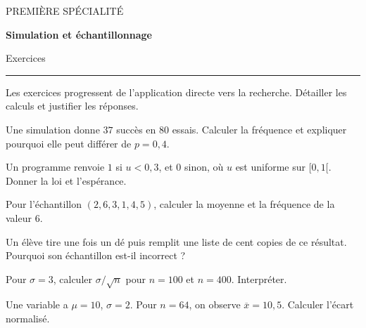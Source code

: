 \documentclass[11pt,a4paper]{article}
\begin{document}
{\small\color{Blue}PREMIÈRE SPÉCIALITÉ}\par{\LARGE\bfseries Simulation et échantillonnage}\par{\large Exercices}\par\vspace{0.2cm}\hrule\vspace{0.4cm}
Les exercices progressent de l’application directe vers la recherche. Détailler les calculs et justifier les réponses.
\par\noindent\begin{minipage}{\linewidth}
Une simulation donne $37$ succès en $80$ essais. Calculer la fréquence et expliquer pourquoi elle peut différer de $p=0,4$.
\end{minipage}\par
\par\noindent\begin{minipage}{\linewidth}
Un programme renvoie $1$ si $u<0,3$, et $0$ sinon, où $u$ est uniforme sur $[0,1[$. Donner la loi et l’espérance.
\end{minipage}\par
\par\noindent\begin{minipage}{\linewidth}
Pour l’échantillon $(2,6,3,1,4,5)$, calculer la moyenne et la fréquence de la valeur $6$.
\end{minipage}\par
\par\noindent\begin{minipage}{\linewidth}
Un élève tire une fois un dé puis remplit une liste de cent copies de ce résultat. Pourquoi son échantillon est-il incorrect ?
\end{minipage}\par
\par\noindent\begin{minipage}{\linewidth}
Pour $\sigma=3$, calculer $\sigma/\sqrt n$ pour $n=100$ et $n=400$. Interpréter.
\end{minipage}\par
\par\noindent\begin{minipage}{\linewidth}
Une variable a $\mu=10$, $\sigma=2$. Pour $n=64$, on observe $\overline x=10,5$. Calculer l’écart normalisé.
\end{minipage}\par
\end{document}
